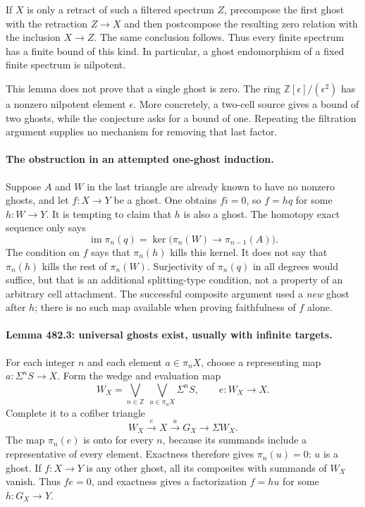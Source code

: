 \documentclass[11pt]{article}
\begin{document}
If $X$ is only a retract of such a filtered spectrum $Z$, precompose the
first ghost with the retraction $Z\to X$ and then postcompose the resulting
zero relation with the inclusion $X\to Z$. The same conclusion follows.
Thus every finite spectrum has a finite bound of this kind. In
particular, a ghost endomorphism of a fixed finite spectrum is nilpotent.

This lemma does not prove that a single ghost is zero. The ring
$\mathbb Z[\epsilon]/(\epsilon^2)$ has a nonzero nilpotent element
$\epsilon$. More concretely, a two-cell source gives a bound of two
ghosts, while the conjecture asks for a bound of one. Repeating the
filtration argument supplies no mechanism for removing that last factor.

\paragraph{The obstruction in an attempted one-ghost induction.}
Suppose $A$ and $W$ in the last triangle are already known to have no
nonzero ghosts, and let $f:X\to Y$ be a ghost. One obtains $fi=0$, so
$f=hq$ for some $h:W\to Y$. It is tempting to claim that $h$ is also
a ghost. The homotopy exact sequence only says
\[
 \operatorname{im}\pi_n(q)
 =\ker\bigl(\pi_n(W)\longrightarrow\pi_{n-1}(A)\bigr).
\]
The condition on $f$ says that $\pi_n(h)$ kills this kernel. It does
not say that $\pi_n(h)$ kills the rest of $\pi_n(W)$. Surjectivity of
$\pi_n(q)$ in all degrees would suffice, but that is an additional
splitting-type condition, not a property of an arbitrary cell attachment.
The successful composite argument used a \emph{new} ghost after $h$;
there is no such map available when proving faithfulness of $f$ alone.

\paragraph{Lemma 482.3: universal ghosts exist, usually with infinite targets.}
For each integer $n$ and each element $a\in\pi_nX$, choose a representing
map $a:\Sigma^nS\to X$. Form the wedge and evaluation map
\[
 W_X=\bigvee_{n\in\mathbb Z}\ \bigvee_{a\in\pi_nX}\Sigma^nS,
 \qquad e:W_X\longrightarrow X.
\]
Complete it to a cofiber triangle
\begin{equation}\label{a482:universal}
        W_X\xrightarrow{e}X\xrightarrow{u}G_X\longrightarrow\Sigma W_X.
\end{equation}
The map $\pi_n(e)$ is onto for every $n$, because its summands include
a representative of every element. Exactness therefore gives $\pi_n(u)=0$:
$u$ is a ghost. If $f:X\to Y$ is any other ghost, all its composites
with summands of $W_X$ vanish. Thus $fe=0$, and exactness gives a
factorization $f=hu$ for some $h:G_X\to Y$.
\end{document}
